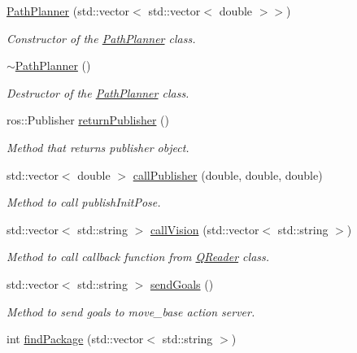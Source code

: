 \begin{DoxyCompactItemize}
\item 
\hyperlink{classPathPlanner_aba3c35cb189f1d3838ad72b531ecc0b0}{Path\+Planner} (std\+::vector$<$ std\+::vector$<$ double $>$$>$)
\begin{DoxyCompactList}\small\item\em Constructor of the \hyperlink{classPathPlanner}{Path\+Planner} class. \end{DoxyCompactList}\item 
\hyperlink{classPathPlanner_a61bd61f848e519df56b75eddd3732ab8}{$\sim$\+Path\+Planner} ()
\begin{DoxyCompactList}\small\item\em Destructor of the \hyperlink{classPathPlanner}{Path\+Planner} class. \end{DoxyCompactList}\item 
ros\+::\+Publisher \hyperlink{classPathPlanner_a58568f3cc90cf9670d9b1cd3aff2e466}{return\+Publisher} ()
\begin{DoxyCompactList}\small\item\em Method that returns publisher object. \end{DoxyCompactList}\item 
std\+::vector$<$ double $>$ \hyperlink{classPathPlanner_aded9b5b27b3ba0369390f37a991c431a}{call\+Publisher} (double, double, double)
\begin{DoxyCompactList}\small\item\em Method to call publish\+Init\+Pose. \end{DoxyCompactList}\item 
std\+::vector$<$ std\+::string $>$ \hyperlink{classPathPlanner_a8ea688c30b9c9ae09330aa55242ba6e0}{call\+Vision} (std\+::vector$<$ std\+::string $>$)
\begin{DoxyCompactList}\small\item\em Method to call callback function from \hyperlink{classQReader}{Q\+Reader} class. \end{DoxyCompactList}\item 
std\+::vector$<$ std\+::string $>$ \hyperlink{classPathPlanner_a49eccb73ef5e4d732d50e2b741f5dd53}{send\+Goals} ()
\begin{DoxyCompactList}\small\item\em Method to send goals to move\+\_\+base action server. \end{DoxyCompactList}\item 
int \hyperlink{classPathPlanner_a6a705be83291d487f6b0c06ef7838c02}{find\+Package} (std\+::vector$<$ std\+::string $>$)
$$
\end{DoxyCompactItemize}
